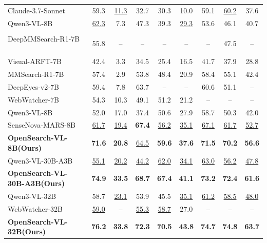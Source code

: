 \begin{table}[!t]
{\begin{tabular}{l ccccccc c}
    Claude-3.7-Sonnet~\citep{Claude_37} & 59.3 & \underline{11.3}   & 32.7 & 30.3 & 10.0 & 59.1   & \underline{60.2}   & 37.6 \\
    Qwen3-VL-8B ~\citep{Qwen3-VL}       & \underline{62.3} & 7.3   & 47.3 & 39.3 & \underline{29.3} & 53.6 & 46.1 & 40.7 \\
    \midrule
    \rowcolor{blue!5}
    \multicolumn{9}{c}{\textbf{Agentic Workflow}} \\
    DeepMMSearch-R1-7B ~\citep{deepmmsearch-r1} & 55.8 & --   & --   & --   & --   & --   & 47.5 & -- \\
    Visual-ARFT-7B ~\citep{liu2025visualarft}                   & 42.4 & 3.3   & 34.5 & 25.4 & 16.5 & 41.7 & 37.9 & 28.8 \\
    MMSearch-R1-7B\citep{mmsearch-r1} & 57.4 & 2.9   & 53.8 & 48.4 & 20.9 & 58.4 & 55.1 & 42.4 \\
    DeepEyes-v2-7B~\citep{deepeyesv2} & 59.4 & 7.8   & 63.7 & --   & --   & 60.6 & 51.1 & -- \\
    WebWatcher-7B~\citep{webwatcher}  & 54.3 & 10.3   & 49.1 & 51.2 & 21.2 & --   & --   & -- \\
    Qwen3-VL-8B~\citep{Qwen3-VL}  & 52.0 & 17.0 & 37.4 & 50.6 & 27.9 & 58.7 & 50.3 & 42.0 \\
    SenseNova-MARS-8B~\citep{chng2025sensenova} & \underline{61.7} & \underline{19.4}   & \textbf{67.4} & \underline{56.2} & \underline{35.1} & \underline{67.1} & \underline{61.7} & \underline{52.7} \\
    \rowcolor{purple!15}
    \textbf{OpenSearch-VL-8B(Ours)}         & \textbf{71.6}   & \textbf{20.8}   & \underline{64.5}   & \textbf{59.6}   & \textbf{37.6}   & \textbf{71.5}   & \textbf{70.2}   & \textbf{56.6} \\
    \midrule
    Qwen3-VL-30B-A3B~\citep{Qwen3-VL} & \underline{55.1}   & \underline{20.2} & \underline{44.2} & \underline{62.0} & \underline{34.1} & \underline{63.0} & \underline{56.2}   & \underline{47.8} \\
    \rowcolor{purple!15}
    \textbf{OpenSearch-VL-30B-A3B(Ours)}    & \textbf{74.9}   & \textbf{33.5}   & \textbf{68.7}   & \textbf{67.4}   & \textbf{41.1}   & \textbf{73.2}   & \textbf{72.4}   & \textbf{61.6} \\
    \midrule
    Qwen3-VL-32B~\citep{Qwen3-VL} & 58.7 & \underline{23.1}  & 53.9 & 45.5 & \underline{35.1} & \underline{61.2} & \underline{58.5} & \underline{48.0} \\
    WebWatcher-32B~\cite{webwatcher} & \underline{59.0} & --   & \underline{55.3} & \underline{58.7} & 27.0 & --   & --   & -- \\
    \rowcolor{purple!15}
    \textbf{OpenSearch-VL-32B(Ours)}        &  \textbf{76.2}  & \textbf{33.8}   & \textbf{72.3}   & \textbf{70.5}   & \textbf{43.8}   & \textbf{74.7}   & \textbf{74.8}   & \textbf{63.7} \\
    \bottomrule
    \end{tabular}
    }
    \label{tab:search-qa-main}
    \vspace{0.6cm}
\end{table}
